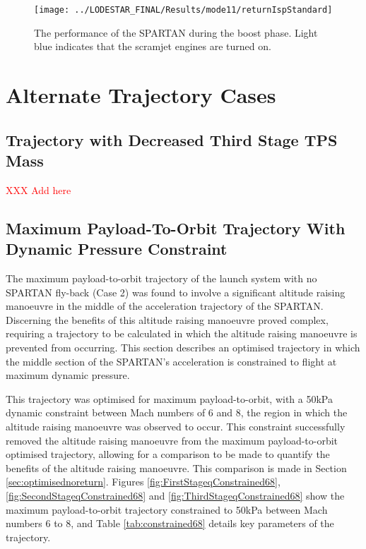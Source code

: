 \begin{figure}[ht]
	\centering
	\texttt{[image: ../LODESTAR\_FINAL/Results/mode11/returnIspStandard]}
	\caption{The performance of the SPARTAN during the boost phase. Light blue indicates that the scramjet engines are turned on.}
	\label{fig:returnIspStandard}
\end{figure}


		\chapter{Alternate Trajectory Cases}
		\section{Trajectory with Decreased Third Stage TPS Mass}
		\textcolor{red}{XXX Add here}
		
		\section{Maximum Payload-To-Orbit Trajectory With Dynamic Pressure Constraint}\label{sec:Appendix_qconst}
		
		The maximum payload-to-orbit trajectory of the launch system with no SPARTAN fly-back (Case 2) was found to involve a significant altitude raising manoeuvre in the middle of the acceleration trajectory of the SPARTAN. Discerning the benefits of this altitude raising manoeuvre proved complex, requiring a trajectory to be calculated in which the altitude raising manoeuvre is prevented from occurring. This section describes an optimised trajectory in which the middle section of the SPARTAN's acceleration is constrained to flight at maximum dynamic pressure. 
		
		 This trajectory was optimised for maximum payload-to-orbit, with a 50kPa dynamic constraint between Mach numbers of 6 and 8, the region in which the altitude raising manoeuvre was observed to occur. This constraint successfully removed the altitude raising manoeuvre from the maximum payload-to-orbit optimised trajectory, allowing for a comparison to be made to quantify the benefits of the altitude raising manoeuvre. This comparison is made in Section \ref{sec:optimisednoreturn}. Figures \ref{fig:FirstStageqConstrained68},  \ref{fig:SecondStageqConstrained68} and \ref{fig:ThirdStageqConstrained68} show the maximum payload-to-orbit trajectory constrained to 50kPa between Mach numbers 6 to 8, and Table \ref{tab:constrained68} details key parameters of the trajectory. 
		
